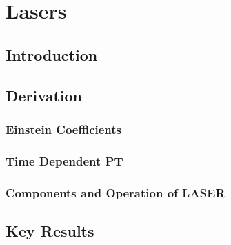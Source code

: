 \chapter{Lasers}
\label{chapt8}

\section{Introduction}

\section{Derivation}

\subsection{Einstein Coefficients}

\subsection{Time Dependent PT}

\subsection{Components and Operation of LASER}

\section{Key Results}
